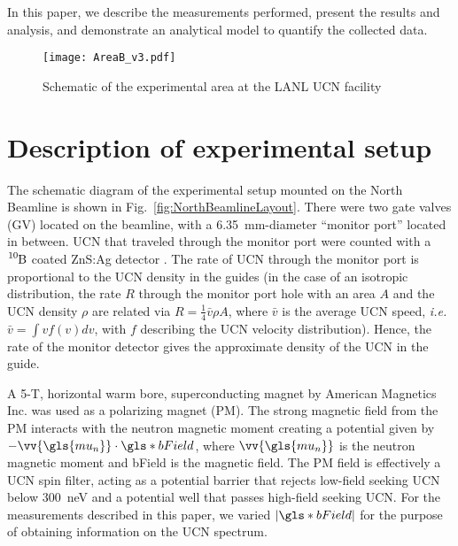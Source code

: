 In this paper, we describe the measurements performed, present the results and analysis, and demonstrate an analytical model to quantify the collected data. 

\begin{figure}[htp]
    \centering
    \texttt{[image: AreaB\_v3.pdf]}
    \caption{Schematic of the experimental area at the LANL UCN facility}
    \label{fig:AreaB_schematic}
\end{figure}


\section{\label{sec:experimentalSetup}Description of experimental setup}


The schematic diagram of the experimental setup mounted on the North Beamline is shown in Fig.~\ref{fig:NorthBeamlineLayout}. There were two gate valves (GV) located on the beamline, with a \qty{6.35}{\mm}-diameter ``monitor port'' located in between. UCN that traveled through the monitor port were counted with a $\ce{^{10}B}$ coated ZnS:Ag detector \cite{jeph_b10_2011}. The rate of UCN through the monitor port is proportional to the UCN density in the guides (in the case of an isotropic distribution, the rate $R$ through the monitor port hole with an area $A$ and the UCN density $\rho$ are related via  $R = \frac{1}{4} \bar{v} \rho A$, where $\bar{v}$ is the average UCN speed, {\it i.e.} $\bar{v} = \int vf(v)dv$, with $f$ describing the UCN velocity distribution). Hence, the rate of the monitor detector gives the approximate density of the UCN in the guide.

A 5-T, horizontal warm bore, superconducting magnet by American Magnetics Inc. was used as a polarizing magnet (PM). The strong magnetic field from the PM interacts with the neutron magnetic moment creating a potential given by $-\vv{\gls{mu_n}} \cdot \gls*{bField}$, where $\vv{\gls{mu_n}}$ is the neutron magnetic moment and \gls{bField} is the magnetic field. The PM field is effectively a UCN spin filter, acting as a potential barrier that rejects low-field seeking UCN below \qty{300}{\nano\eV} and a potential well that passes high-field seeking UCN. For the measurements described in this paper, we varied $ |\gls*{bField} |$ for the purpose of obtaining information on the UCN spectrum.

